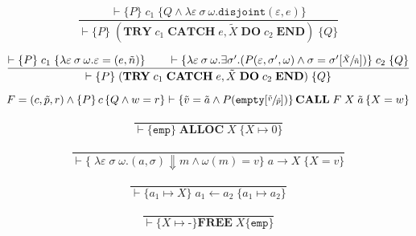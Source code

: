 \begin{equation}\label{eqn:hoare-try}
\frac{\vdash \{P\} \; c_1 \; \{Q \wedge \lambda \varepsilon\:\sigma\:\omega. \texttt{disjoint}(\varepsilon, e)\}}{\vdash \{P\} \; (\textbf{TRY}\; c_1\; \textbf{CATCH}\; e, \tilde{X}\; \textbf{DO}\; c_2\; \textbf{END}) \; \{Q\}}
\end{equation}

\begin{equation}\label{eqn:hoare-catch}
\frac{\vdash \{P\} \; c_1 \; \{\lambda \varepsilon\:\sigma\:\omega. \varepsilon = (e, \tilde{n})\} \qquad \vdash \{\lambda \varepsilon\:\sigma\:\omega. \exists \sigma'. (P(\varepsilon, \sigma', \omega) \wedge \sigma = \sigma'[\sfrac{\tilde{X}}{\tilde{n}}])\} \; c_2 \; \{Q\}}{\vdash \{P\} \; (\textbf{TRY}\; c_1\; \textbf{CATCH}\; e, \tilde{X}\; \textbf{DO}\; c_2\; \textbf{END}) \; \{Q\}}
\end{equation}

\begin{equation}\label{eqn:hoare-call}
F = (c,\tilde{p},r) \wedge \left\{P\right\} c \left\{Q \wedge w = r\right\} \vdash \left\{\tilde{v} = \tilde{a} \wedge P(\texttt{empty}[\sfrac{\tilde{v}}{\tilde{p}}])\right\}\textbf{CALL} \; F \; X \; \tilde{a} \left\{X = w\right\}
\end{equation}

\begin{equation}\label{eqn:hoare-alloc}
\frac{}{\vdash \{ \texttt{emp} \}\; \textbf{ALLOC}\;X \; \{X \mapsto 0\}}
\end{equation}

\begin{equation}\label{eqn:hoare-read}
\frac{}{\vdash \{\; \lambda\varepsilon\;\sigma\;\omega.(a,\sigma)\Downarrow m \wedge \omega(m) = v\}\; a \rightarrow X \;\{ X = v \}}
\end{equation}

\begin{equation}\label{eqn:hoare-write}
\frac{}{\vdash \{ a_1 \mapsto X \}\; a_1 \leftarrow a_2 \;\{ a_1 \mapsto a_2 \}}
\end{equation}

\begin{equation}\label{eqn:hoare-free}
\frac{}{\vdash \{X \mapsto \textbf{-}\}\textbf{FREE}\;X \{\texttt{emp} \}}
\end{equation}
